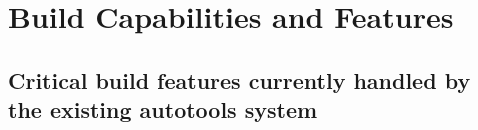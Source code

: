 \documentclass[pdf,ps2pdf,11pt]{SANDreport}
\begin{document}

%
\setcounter{secnumdepth}{3}
\SANDmain %


%
\section{Build Capabilities and Features}
%


%
{}\subsection{Critical build features currently handled by the
existing autotools system}
%
\end{document}

